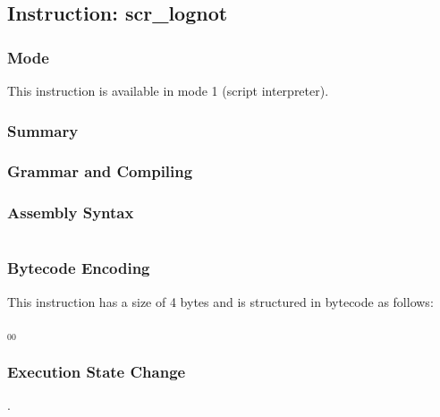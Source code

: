 \subsection{Instruction: scr\_lognot}

\subsubsection{Mode}
This instruction is available in mode 1 (script interpreter).
\subsubsection{Summary}


\subsubsection{Grammar and Compiling}


\subsubsection{Assembly Syntax}

\begin{myquote}
\begin{verbatim}

\end{verbatim}
\end{myquote}

\subsubsection{Bytecode Encoding}

This instruction has a size of 4 bytes and is structured in bytecode as follows:

$_{00}$\ 

\subsubsection{Execution State Change}

.


